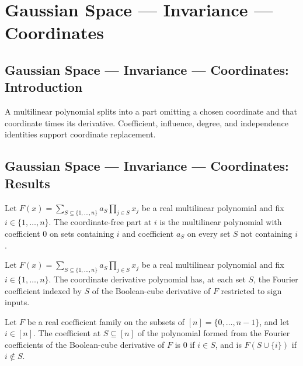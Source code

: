 \section{Gaussian Space --- Invariance --- Coordinates}
\subsection*{Gaussian Space --- Invariance --- Coordinates: Introduction}
A multilinear polynomial splits into a part omitting a chosen coordinate and that coordinate times its derivative. Coefficient, influence, degree, and independence identities support coordinate replacement.

\subsection*{Gaussian Space --- Invariance --- Coordinates: Results}

\begin{definition}
\leanok
{}
Let $F(x)=\sum_{S\subseteq\{1,\ldots,n\}}a_S\prod_{j\in S}x_j$ be a real multilinear polynomial and fix $i\in\{1,\ldots,n\}$. The coordinate-free part at $i$ is the multilinear polynomial with coefficient $0$ on sets containing $i$ and coefficient $a_S$ on every set $S$ not containing $i$.
\end{definition}

\begin{definition}
\leanok
{}
Let $F(x)=\sum_{S\subseteq\{1,\ldots,n\}}a_S\prod_{j\in S}x_j$ be a real multilinear polynomial and fix $i\in\{1,\ldots,n\}$. The coordinate derivative polynomial has, at each set $S$, the Fourier coefficient indexed by $S$ of the Boolean-cube derivative of $F$ restricted to sign inputs.
\end{definition}

\begin{lemma}
\leanok
{}
Let $F$ be a real coefficient family on the subsets of $[n]=\{0,\ldots,n-1\}$, and let
$i\in[n]$. The coefficient at $S\subseteq[n]$ of the polynomial formed from the Fourier
coefficients of the Boolean-cube derivative of $F$ is $0$ if $i\in S$, and is
$F(S\cup\{i\})$ if $i\notin S$.
\end{lemma}


